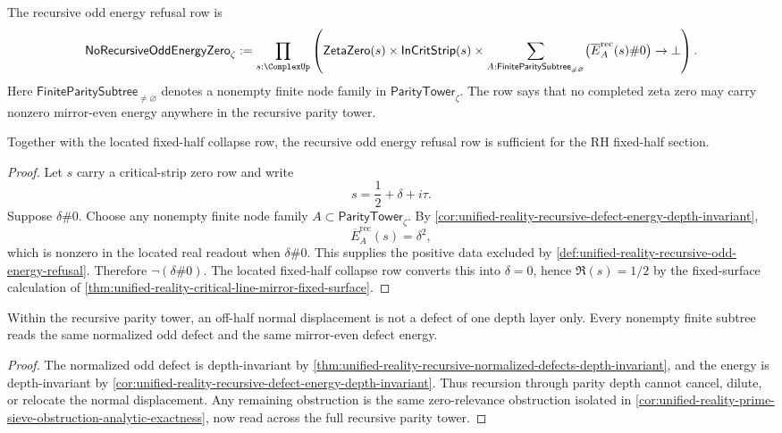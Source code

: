 \begin{definition}
\label{def:unified-reality-recursive-odd-energy-refusal}
The recursive odd energy refusal row is
$$
\mathsf{NoRecursiveOddEnergyZero}_{\zeta}
:=
\prod_{s:\ComplexUp}
\left(
\mathsf{ZetaZero}(s)
\times
\mathsf{InCritStrip}(s)
\times
\sum_{A:\mathsf{FiniteParitySubtree}_{\ne\varnothing}}
\bigl(\overline E_A^{\mathrm{rec}}(s)\#0\bigr)
\to
\bot
\right).
$$
Here $\mathsf{FiniteParitySubtree}_{\ne\varnothing}$ denotes a nonempty
finite node family in
$\mathsf{ParityTower}_{\zeta}$.  The row says that no completed zeta
zero may carry nonzero mirror-even energy anywhere in the recursive
parity tower.
\end{definition}

\begin{theorem}
\label{thm:unified-reality-recursive-odd-energy-refusal-conditionally-sufficient}
Together with the located fixed-half collapse row, the recursive odd
energy refusal row is sufficient for the RH fixed-half section.
\end{theorem}

\begin{proof}
Let $s$ carry a critical-strip zero row and write
$$
s=\frac12+\delta+i\tau.
$$
Suppose $\delta\#0$.  Choose any nonempty finite node family
$A\subset\mathsf{ParityTower}_{\zeta}$.  By
\autoref{cor:unified-reality-recursive-defect-energy-depth-invariant},
$$
\overline E_A^{\mathrm{rec}}(s)=\delta^2,
$$
which is nonzero in the located real readout when $\delta\#0$.  This
supplies the positive data excluded by
\autoref{def:unified-reality-recursive-odd-energy-refusal}.  Therefore
$\neg(\delta\#0)$.  The located fixed-half collapse row converts this
into $\delta=0$, hence $\Re(s)=1/2$ by the fixed-surface calculation of
\autoref{thm:unified-reality-critical-line-mirror-fixed-surface}.
\end{proof}

\begin{corollary}
\label{cor:unified-reality-recursive-parity-does-not-hide-off-half-defect}
Within the recursive parity tower, an off-half normal displacement is not
a defect of one depth layer only.  Every nonempty finite subtree reads
the same normalized odd defect and the same mirror-even defect energy.
\end{corollary}

\begin{proof}
The normalized odd defect is depth-invariant by
\autoref{thm:unified-reality-recursive-normalized-defects-depth-invariant},
and the energy is depth-invariant by
\autoref{cor:unified-reality-recursive-defect-energy-depth-invariant}.
Thus recursion through parity depth cannot cancel, dilute, or relocate
the normal displacement.  Any remaining obstruction is the same
zero-relevance obstruction isolated in
\autoref{cor:unified-reality-prime-sieve-obstruction-analytic-exactness},
now read across the full recursive parity tower.
\end{proof}

